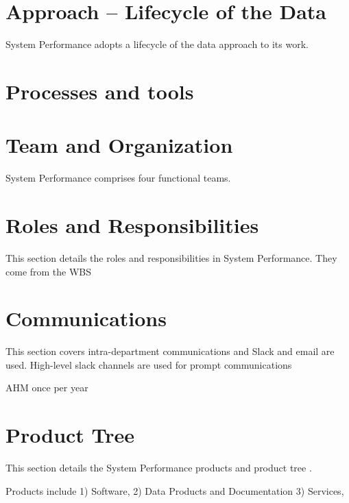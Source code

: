 \section{Approach -- Lifecycle of the Data} 

System Performance adopts a lifecycle of the data approach to its work. 


\section{Processes and tools}


\section{Team and Organization}

System Performance comprises four functional teams. 





\section{Roles and Responsibilities}


This section details the roles and responsibilities in System Performance. 
They come from the WBS 

\section{Communications}

This section covers intra-department communications and 
Slack and email are used. 
High-level slack channels are used for prompt communications 

AHM once per year

\section{Product Tree }

This section details the System Performance products and product tree . 

Products include 1) Software, 2) Data Products and Documentation 3) Services, 
